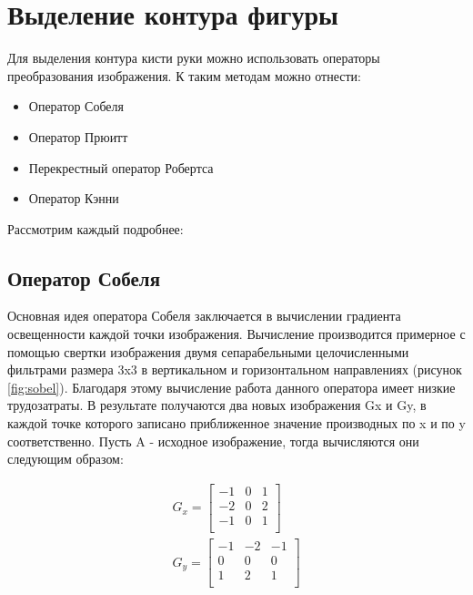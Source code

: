 \section{Выделение контура фигуры}
\label{sec:Edge}

Для выделения контура кисти руки можно использовать операторы преобразования изображения. К таким методам можно отнести:

\begin{itemize}
	\item Оператор Собеля \cite{Sobel}
	\item Оператор Прюитт \cite{Prewitt}
	\item Перекрестный оператор Робертса \cite{Roberts}
	\item Оператор Кэнни \cite{Canny}
\end{itemize}

Рассмотрим каждый подробнее:

\subsection{Оператор Собеля}

Основная идея оператора Собеля\cite{Sobel} заключается в вычислении градиента освещенности каждой точки изображения. Вычисление производится примерное с помощью свертки изображения двумя сепарабельными целочисленными фильтрами размера 3x3 в вертикальном и горизонтальном направлениях (рисунок \ref{fig:sobel}). Благодаря этому вычисление работа данного оператора имеет низкие трудозатраты. В результате получаются два новых изображения Gx и Gy, в каждой точке которого записано приближенное значение производных по x и по y соответственно. Пусть A - исходное изображение, тогда вычисляются они следующим образом:

\begin{eqnarray}\label{eq:sobel-matrixs}
G_x = \begin{bmatrix}
-1 & 0 & 1\\
-2 & 0 & 2\\
-1 & 0 & 1\\
\end{bmatrix} \\
G_y = \begin{bmatrix}
-1 & -2 & -1\\
0 & 0 & 0\\
1 & 2 & 1\\
\end{bmatrix}
\end{eqnarray}

